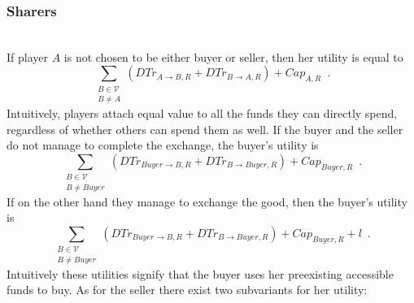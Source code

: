   \subsubsection{Sharers} \ \\

    If player $A$ is not chosen to be either buyer or seller, then her utility is equal to 
    \begin{equation*}
      \sum\limits_{\substack{B \in \mathcal{V} \\ B \neq A}}\left(DTr_{A \rightarrow B, R} + DTr_{B \rightarrow A, R}\right) +
      Cap_{A, R} \enspace.
    \end{equation*}
    Intuitively, players attach equal value to all the funds they can directly spend, regardless of whether others can spend
    them as well. If the buyer and the seller do not manage to complete the exchange, the buyer's utility is
    \begin{equation*}
      \sum\limits_{\substack{B \in \mathcal{V} \\ B \neq Buyer}}\left(DTr_{Buyer \rightarrow B, R} + DTr_{B \rightarrow Buyer,
      R}\right) + Cap_{Buyer, R} \enspace.
    \end{equation*}
    If on the other hand they manage to exchange the good, then the buyer's utility is 
    \begin{equation*}
      \sum\limits_{\substack{B \in \mathcal{V} \\ B \neq Buyer}}\left(DTr_{Buyer \rightarrow B, R} + DTr_{B \rightarrow Buyer,
      R}\right) + Cap_{Buyer, R} + l \enspace.
    \end{equation*}
    Intuitively these utilities signify that the buyer uses her preexisting accessible funds to buy. As for the seller there
    exist two subvariants for her utility:
